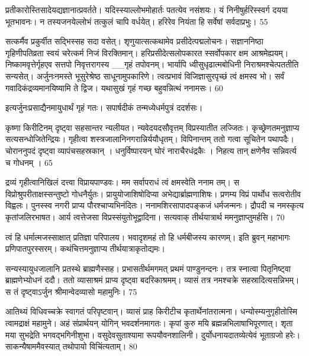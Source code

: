 प्रतीकारोस्तिसादेयद्यज्ञानात्प्रवर्तते।
यदिस्स्याल्लोभमोहार्तः पतत्येव नसंशयः।
यं निनीषुर्हरिस्स्वर्ग दयया भूतभावनः।
न तस्यजनयेल्लोभं तत्कुलं चापि वर्धयेत्।
हरिरेव नियंता हि सर्वेषां सर्वदाप्रभुः।
55

सत्कर्मैव प्रकुर्वीत सद्भिस्सह सदा वसेत्।
शृणुयात्सत्कथामेव प्रसीदेत्पद्मलोचनः।
सज्ञाननिष्ठा गृहिणीपतिव्रता स्वयं चरेत्कर्म
निजं विरक्तिमान्।
हरिप्रसीदेत्सलोपकारत स्सर्वोपकार
क्षम आश्रमेह्ययम्।
निष्कामवृत्तेर्गृहएव सत्तपो निवृत्तरागस्य
__गृहं तपोवनम्।
भार्यापि ध्वीसुधृढात्मबोधिनी
निराश्रमश्चेत्पततीति सन्यसेत्।
अर्जुनःनमस्ते भूसुरेश्रेष्ठ साधूनामुपकारिणे।
त्वत्प्रभावं विजिज्ञासुरपृच्छं त्वं क्षमस्व भो।
सर्वं गवादिकंद्रव्यमानयिष्यामि ते द्विज।
यथासुखं गृहं गच्छ बहुवन्नित्थं ननामसः।
60

इत्यर्जुनःप्रसाद्यैनमायुधार्थं गृहं गतः।
सपार्षदीकं तन्मध्येधर्मपुत्रं ददर्शसः।

कृष्णा किरीटिनम् दृष्ट्वा सहसान्तर न्यलीयत।
न्यवेदयदसौवृत्तम् विप्रस्यातीत लज्जितः।
कृच्छ्रेणतमनुज्ञाप्य सत्यसन्धोजितेन्द्रियः।
गृहीत्वा शस्त्रजालानिनगरान्निर्ययौधृतम्।
विपिनान्तम् ततो गत्वा सूचितेन पथापदैः।
चोराननुपदं दृष्ट्वा व्यापंचसहस्रकान् ।
धनुर्विष्पारयन् घोरं नाराचैरधंद्रकैः ।
निहत्य तान् क्षणेनैव सन्निवर्त्य च गोधनम् ।
65

द्रव्यं गृहीत्वानिखिलं दत्त्वा विप्रायपाण्डवः।
मम सर्वापराधं त्वं क्षमस्वेति ननाम तम्।
स विप्रोश्रुपरीताक्षस्सन्तुष्टो गोधनैर्युतः।
प्रायुयोजाशिषोदिप्या अभेद्यार्ब्राह्मणाशिषः।
प्रणम्य विप्रं पार्थोध सत्वरोतीव विह्वलः।
पुनस्स्व नगरी प्राप्य पौरश्चाप्यभिनंदितः।
ननामशिरसापादपङ्कजं धर्मजन्मनः।
द्रौपदी च नमस्कृत्य कृतांजलिरभाषत।
आर्य त्वत्तेजसा विप्रस्संयुतोभूद्वादिना।
सत्यवाक् तीर्थयात्रार्थ ममनुज्ञाप्तुमर्हसि।
70

त्वं हि धर्मात्मजस्साक्षात् प्रतिज्ञा परिपालय।
भवादृशमहं तो हि धर्मबीजस्य कारणम्।
इति ब्रुवन् महाभागः प्रणिपातपुरस्सरम्।
कथंचित्तमनुज्ञाप्य तीर्थयात्राकृतोद्यमः।

सन्यस्यायुधजालानि प्रतस्थे ब्राह्मणैस्सह।
प्रभासतीर्थमगमत् प्रथमं पाण्डुनन्दनः।
तत्र स्नात्वा पितृनिष्ट्वा ब्राह्मणेभ्योधनं ददौ।
ततो व्यासाश्रमं प्राप्य दृष्ट्वा बदरिकाश्रमम्।
व्यासं तत्र नमश्चक्रे सहस्रादित्यसन्निभम्।
स तं दृष्ट्वाऽर्जुन श्रीमान्वेदव्यासो महामुनिः।
75

आतिथ्यं विधिवच्चक्रे स्वागतं परिपृष्टवान्।
व्यासं प्राह किरीटीच कृतार्थेनांतरात्मना।
धन्योस्म्यनुगृहीतोस्मि त्वामद्राक्षं महामुने।
अहं संप्रार्थयन् योगिन् भवदर्शनमागतः।
कृपां कुरु मयि ब्रह्मन्नभिलाषाभिपूरणात्।
शृता मया सुभद्रेति भगवद्भगिनीशुभा।
वसुदेवसुताश्यामा रूपयौवनशालिनी।
दुर्योधनायदातव्येत्येवं भूताग्रजो हरेः।
साकन्यैषाममैवस्यात् तथोपायो विचिंत्यताम्।
80

